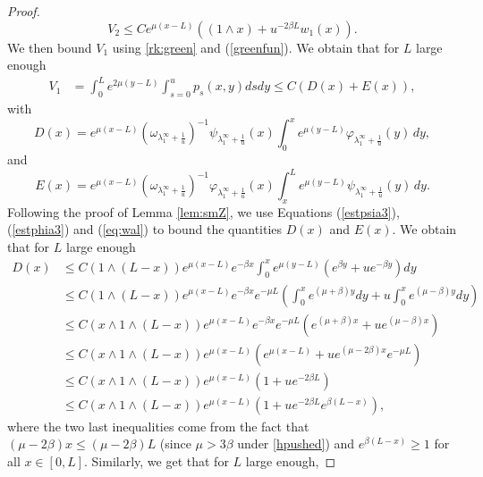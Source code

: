 \documentclass[11pt]{article}
\theoremstyle{plain}
\newcommand\linf{\lambda_1^\infty}
\begin{document}
\begin{proof}
\begin{equation}
V_2\leqslant  Ce^{\mu(x-L)}\left((1\wedge x)+u^{-2\beta L}w_1(x)\right).\label{est:U2}
\end{equation}
We then bound $V_1$ using  \eqref{rk:green} and (\ref{greenfun}). We obtain that for $L$ large enough
\begin{align}
V_1&=\int_0^Le^{2\mu(y-L)}\int_{s=0}^u p_s(x,y)dsdy \leqslant C(D(x)+E(x)),
\label{B1B2}\end{align}
with 
\begin{equation*}
D(x)= e^{\mu(x-L)}\left(\omega_{\linf+\frac{1}{u}} \right)^{-1}\psi_{\linf+\frac{1}{u}}(x)\int_0^x e^{\mu(y-L)}\varphi_{\linf+\frac{1}{u}}(y)\,dy,
\end{equation*}
and
\begin{equation*}
E(x)= e^{\mu(x-L)}\left(\omega_{\linf+\frac{1}{u}}\right)^{-1}\varphi_{\linf+\frac{1}{u}}(x)\int_x^L e^{\mu(y-L)}\psi_{\linf+\frac{1}{u}}(y)\,dy.
\end{equation*}
Following the proof of Lemma \ref{lem:smZ}, we use Equations (\ref{estpsia3}), (\ref{estphia3}) and (\ref{eq:wal}) to bound the quantities $D(x)$ and $E(x)$. We obtain that for $L$ large enough
\begin{align*}
D(x)&\leqslant  C(1\wedge (L-x))e^{\mu(x-L)} e^{-\beta x}\int_0^x e^{\mu(y-L)}\left(e^{\beta y}+ue^{-\beta y}\right)dy\\
&\leqslant C(1\wedge (L-x))e^{\mu(x-L)} e^{-\beta x}e^{-\mu L}\left(\int_0^xe^{(\mu+\beta)y}dy+ u\int_0^xe^{(\mu-\beta)y }dy\right)\\
&\leqslant C(x\wedge1\wedge (L-x))e^{\mu(x-L)} e^{-\beta x}e^{-\mu L}\left(e^{(\mu+\beta)x}+ ue^{(\mu-\beta)x}\right)\\
&\leqslant  C(x\wedge 1\wedge (L-x))e^{\mu(x-L)}\left(e^{\mu(x-L)}+ue^{(\mu-2\beta)x}e^{-\mu L}\right)\\
&\leqslant  C(x\wedge 1\wedge (L-x))e^{\mu(x-L)}\left(1+ue^{-2\beta L}\right)\\
&\leqslant  C(x\wedge 1\wedge (L-x))e^{\mu(x-L)}\left(1+ue^{-2\beta L}e^{\beta (L-x)}\right),
\end{align*}
where the two last inequalities come from the fact that $(\mu-2\beta)x\leqslant (\mu-2\beta)L$ (since $\mu>3\beta$ under \eqref{hpushed}) and $e^{\beta(L-x)}\geq 1$ for all $x\in[0,L]$. Similarly, we get that for $L$ large enough, 

\end{proof}
\end{document}

